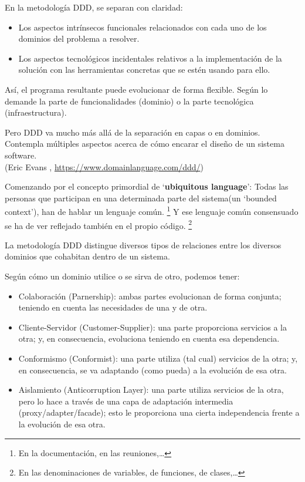 \documentclass[spanish,12pt,a4paper,final,oneside]{book}
\begin{document}
En la metodología DDD, se separan con claridad:
\begin{itemize}
\item Los aspectos intrínsecos funcionales relacionados con cada uno de los dominios del problema a resolver. 
\item Los aspectos tecnológicos incidentales relativos a la implementación de la solución con las herramientas concretas que se estén usando para ello.
\end{itemize}

\vspace{0.2cm}
Así, el programa resultante puede evolucionar de forma flexible. Según lo demande la parte de funcionalidades (dominio) o la parte tecnológica (infraestructura).

Pero DDD va mucho más allá de la separación en capas o en dominios. Contempla múltiples aspectos acerca de cómo encarar el diseño de un sistema software. 
\\(Eric Evans , \url{https://www.domainlanguage.com/ddd/})

Comenzando por el concepto primordial de `\textbf{ubiquitous language}': Todas las personas que participan en una determinada parte del sistema(un `bounded context'), han de hablar un lenguaje común. \footnote{En la documentación, en las reuniones,\ldots} Y ese lenguaje común consensuado se ha de ver reflejado también en el propio código. \footnote{En las denominaciones de variables, de funciones, de clases,\ldots}


\vspace{0.5cm}
La metodología DDD distingue diversos tipos de relaciones entre los diversos dominios que cohabitan dentro de un sistema.

Según cómo un dominio utilice o se sirva de otro, podemos tener:
\begin{itemize}

\item Colaboración (Parnership): ambas partes evolucionan de forma conjunta; teniendo en cuenta las necesidades de una y de otra.

\item Cliente-Servidor (Customer-Supplier): una parte proporciona servicios a la otra; y, en consecuencia, evoluciona teniendo en cuenta esa dependencia.

\item Conformismo (Conformist): una parte utiliza (tal cual) servicios de la otra; y, en consecuencia, se va adaptando (como pueda) a la evolución de esa otra.

\item Aislamiento (Anticorruption Layer): una parte utiliza servicios de la otra, pero lo hace a través de una capa de adaptación intermedia (proxy/adapter/facade); esto le proporciona una cierta independencia frente a la evolución de esa otra.

\end{itemize}
\end{document}
